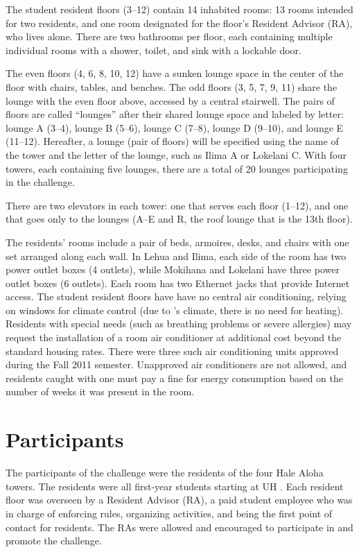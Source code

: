 The student resident floors (3--12) contain 14 inhabited rooms: 13 rooms intended for two residents, and one room designated for the floor's Resident Advisor (RA), who lives alone. There are two bathrooms per floor, each containing multiple individual rooms with a shower, toilet, and sink with a lockable door.

The even floors (4, 6, 8, 10, 12) have a sunken lounge space in the center of the floor with chairs, tables, and benches. The odd floors (3, 5, 7, 9, 11) share the lounge with the even floor above, accessed by a central stairwell. The pairs of floors are called ``lounges'' after their shared lounge space and labeled by letter: lounge A (3--4), lounge B (5--6), lounge C (7--8), lounge D (9--10), and lounge E (11--12). Hereafter, a lounge (pair of floors) will be specified using the name of the tower and the letter of the lounge, such as Ilima A or Lokelani C. With four towers, each containing five lounges, there are a total of 20 lounges participating in the challenge.

There are two elevators in each tower: one that serves each floor (1--12), and one that goes only to the lounges (A--E and R, the roof lounge that is the 13th floor).

The residents' rooms include a pair of beds, armoires, desks, and chairs with one set arranged along each wall. In Lehua and Ilima, each side of the room has two power outlet boxes (4 outlets), while Mokihana and Lokelani have three power outlet boxes (6 outlets). Each room has two Ethernet jacks that provide Internet access. The student resident floors have have no central air conditioning, relying on windows for climate control (due to \Hawaii's climate, there is no need for heating). Residents with special needs (such as breathing problems or severe allergies) may request the installation of a room air conditioner at additional cost beyond the standard housing rates. There were three such air conditioning units approved during the Fall 2011 semester. Unapproved air conditioners are not allowed, and residents caught with one must pay a fine for energy consumption based on the number of weeks it was present in the room.


\section{Participants}
\label{sec:participants}

The participants of the challenge were the residents of the four Hale Aloha towers. The residents were all first-year students starting at UH \Manoa. Each resident floor was overseen by a Resident Advisor (RA), a paid student employee who was in charge of enforcing rules, organizing activities, and being the first point of contact for residents. The RAs were allowed and encouraged to participate in and promote the challenge.

